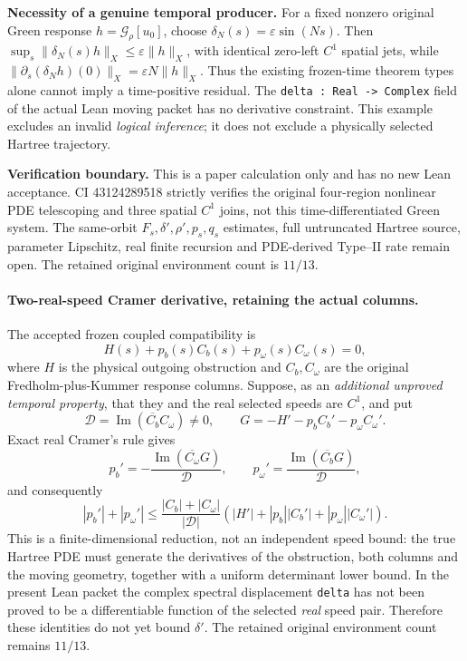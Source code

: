 \noindent\textbf{Necessity of a genuine temporal producer.}
For a fixed nonzero original Green response
\(h=\mathcal G_\rho[u_0]\), choose
\(\delta_N(s)=\varepsilon\sin(Ns)\).
Then \(\sup_s\|\delta_N(s)h\|_X
\le\varepsilon\|h\|_X\), with identical
zero-left \(C^1\) spatial jets, while
\(\|\partial_s(\delta_Nh)(0)\|_X
=\varepsilon N\|h\|_X\).
Thus the existing frozen-time theorem types alone cannot imply
a time-positive residual. The \texttt{delta : Real -> Complex}
field of the actual Lean moving packet has no derivative constraint.
This example excludes an invalid \emph{logical inference}; it does
not exclude a physically selected Hartree trajectory.

\noindent\textbf{Verification boundary.}
This is a paper calculation only and has no new Lean acceptance.
CI 43124289518 strictly verifies the original four-region
nonlinear PDE telescoping and three spatial \(C^1\) joins, not
this time-differentiated Green system. The same-orbit
\(F_s,\delta',\rho',p_s,q_s\) estimates, full untruncated Hartree
source, parameter Lipschitz, real finite recursion and
PDE-derived Type--II rate remain open. The retained original
environment count is \(11/13\).


\paragraph{Two-real-speed Cramer derivative, retaining the actual columns.}
The accepted frozen coupled compatibility is
\[
H(s)+p_b(s)C_b(s)+p_\omega(s)C_\omega(s)=0,
\]
where \(H\) is the physical outgoing obstruction and \(C_b,C_\omega\)
are the original Fredholm-plus-Kummer response columns. Suppose,
as an \emph{additional unproved temporal property}, that they and
the real selected speeds are \(C^1\), and put
\[
\mathcal D=\operatorname{Im}(\overline{C_b}C_\omega)\ne0,\qquad
G=-H'-p_b C_b'-p_\omega C_\omega'.
\]
Exact real Cramer's rule gives
\[
\boxed{\quad
p_b'=-\frac{\operatorname{Im}(\overline{C_\omega}G)}{\mathcal D},
\qquad
p_\omega'=\frac{\operatorname{Im}(\overline{C_b}G)}{\mathcal D},
\quad}
\]
and consequently
\[
|p_b'|+|p_\omega'|\le
\frac{|C_b|+|C_\omega|}{|\mathcal D|}
\left(|H'|+|p_b||C_b'|+|p_\omega||C_\omega'|\right).
\]
This is a finite-dimensional reduction, not an independent speed bound:
the true Hartree PDE must generate the derivatives of the obstruction,
both columns and the moving geometry, together with a uniform
determinant lower bound. In the present Lean packet the complex
spectral displacement \texttt{delta} has not been proved to be a
differentiable function of the selected \emph{real} speed pair.
Therefore these identities do not yet bound \(\delta'\).
The retained original environment count remains \(11/13\).
